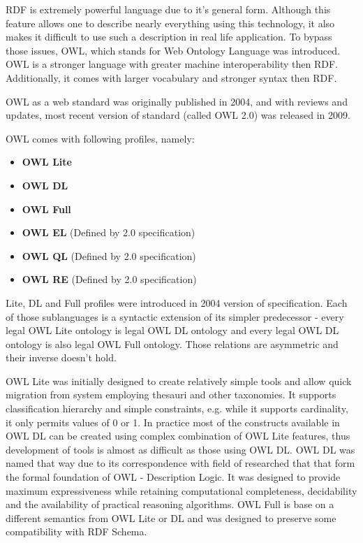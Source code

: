 RDF is extremely powerful language due to it\rq{}s general form. Although this feature allows one to describe nearly everything using this technology, it also makes it difficult to use such a description in real life application. To bypass those issues, OWL, which stands for Web Ontology Language was introduced. OWL is a stronger language with greater machine interoperability then RDF. Additionally, it comes with larger vocabulary and stronger syntax then RDF.

OWL as a web standard was originally published in 2004, and with reviews and updates, most recent version of standard (called OWL 2.0) was released in 2009\cite{owlRef:2009, owlPrimer:2009}.

OWL comes with following profiles, namely:

\begin{itemize}
\item{ {\bf OWL Lite}}
\item{ {\bf OWL DL}}
\item{ {\bf OWL Full}}
\item{ {\bf OWL EL} (Defined by 2.0 specification)}
\item{ {\bf OWL QL} (Defined by 2.0 specification)}
\item{ {\bf OWL RE} (Defined by 2.0 specification)}
\end{itemize}

Lite, DL and Full profiles were introduced in 2004 version of specification. Each of those sublanguages is a syntactic extension of its simpler predecessor - every legal OWL Lite ontology is legal OWL DL ontology and every legal OWL DL ontology is also legal OWL Full ontology. Those relations are asymmetric and their inverse doesn\rq{}t hold. 

OWL Lite was initially designed to create relatively simple tools and allow quick migration from system employing thesauri and other taxonomies. It supports classification hierarchy and simple constraints, e.g. while it supports cardinality, it only permits values of 0 or 1. In practice most of the constructs available in OWL DL can be created using complex combination of OWL Lite features, thus development of tools is almost as difficult as those using OWL DL. OWL DL was named that way due to its correspondence with field of researched that that form the formal foundation of OWL - Description Logic. It was designed to provide maximum expressiveness while retaining computational completeness, decidability and the availability of practical reasoning algorithms. OWL Full is base on a different semantics from OWL Lite or DL and was designed to preserve some compatibility with RDF Schema. 

